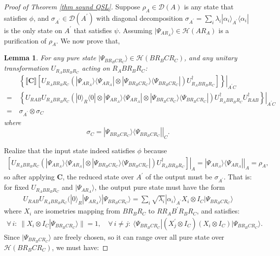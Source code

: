 \documentclass[conference,compsoc, 10pt]{IEEEtran}
\newtheorem{lemma}{Lemma}[section]
\newcommand {\cD } {{\mathcal{D}}}
\newcommand {\cH } {{\mathcal{H}}}
\newcommand {\rt }[2] {{\left.{#1}\right|_{#2}}}
\newcommand {\prog } {{\mathbf{C}}}
\newcommand {\sem}[1] {\llbracket#1\rrbracket}
\def\>{\ensuremath{\rangle}}
\def\<{\ensuremath{\langle}}
\begin{document}
\begin{appendices}
\begin{proof}[Proof of Theorem \ref{thm sound QSL}]
			Suppose $\rho_{A}\in\cD(A)$ is any state that satisfies $\phi$, and $\sigma_{A^\prime}\in\cD(A^\prime)$ with diagonal decomposition $\sigma_{A^\prime} = \sum_i\lambda_i|\alpha_i\>_{A^\prime}\<\alpha_i|$ is the only state on $A^\prime$ that satisfies $\psi$.
			Assuming $|\Psi_{AR_A}\> \in \cH(AR_A)$ is a purification of $\rho_{A}$. We now prove that, 
			\begin{lemma}
				\label{lem proof of FrameS 1}
				For any pure state $|\Psi_{BR_BCR_C}\> \in \cH(BR_BCR_C)$, and any unitary transformation $U_{R_ABR_BR_C}$ acting on $R_ABR_BR_C$:
				\begin{align}
				\label{eqn proof of FrameS 1}
				&\rt{\left\{\sem{\prog}\left[U_{R_ABR_BR_C}(|\Psi_{AR_A}\>\<\Psi_{AR_A}|\otimes|\Psi_{BR_BCR_C}\>\<\Psi_{BR_BCR_C}|)U^\dag_{R_ABR_BR_C}\right]\right\}}{A^\prime C} \\
				=\ &\rt{\left\{U_{RAB}U_{R_ABR_BR_C}(|0\>_R\<0|\otimes|\Psi_{AR_A}\>\<\Psi_{AR_A}|\otimes|\Psi_{BR_BCR_C}\>\<\Psi_{BR_BCR_C}|)U^\dag_{R_ABR_BR_C}U_{RAB}^\dag\right\}}{A^\prime C} \\
				=\ &\sigma_{A^\prime}\otimes\sigma_C
				\end{align}
				where $$\sigma_C = \rt{|\Psi_{BR_BCR_C}\>\<\Psi_{BR_BCR_C}|}{C}.$$
			\end{lemma}
			Realize that the input state indeed satisfies $\phi$ because
			\begin{align*}
			\rt{\left[U_{R_ABR_BR_C}(|\Psi_{AR_A}\>\<\Psi_{AR_A}|\otimes|\Psi_{BR_BCR_C}\>\<\Psi_{BR_BCR_C}|)U^\dag_{R_ABR_BR_C}\right]}{A} = \rt{|\Psi_{AR_A}\>\<\Psi_{AR_A}|}{A} = \rho_A,
			\end{align*}
			so after applying $\prog$, the reduced state over $A^\prime$ of the output must be $\sigma_{A^\prime}$. That is: for fixed $U_{R_ABR_BR_C}$ and $|\Psi_{AR_A}\>$, the output pure state must have the form
			\begin{align*}
			U_{RAB}U_{R_ABR_BR_C}(|0\>_R|\Psi_{AR_A}\>|\Psi_{BR_BCR_C}\> = \sum_i\sqrt{\lambda_i}|\alpha_i\>_{A^\prime} X_i\otimes I_C |\Psi_{BR_BCR_C}\>
			\end{align*}
			where $X_i$ are isometries mapping from $BR_BR_C$ to $RR_AB^\prime R_BR_C$, and satisfies:
			\begin{align*}
			\forall\, i:\ \|X_i\otimes I_C |\Psi_{BR_BCR_C}\>\| = 1,\quad 
			\forall\, i\neq j:\ \<\Psi_{BR_BCR_C}|(X_j^\prime \otimes I_C)(X_i\otimes I_C) |\Psi_{BR_BCR_C}\>.
			\end{align*}
			Since $|\Psi_{BR_BCR_C}\>$ are freely chosen, so it can range over all pure state over $\cH(BR_BCR_C)$, we must have:

\end{proof}
\end{appendices}
\end{document}
